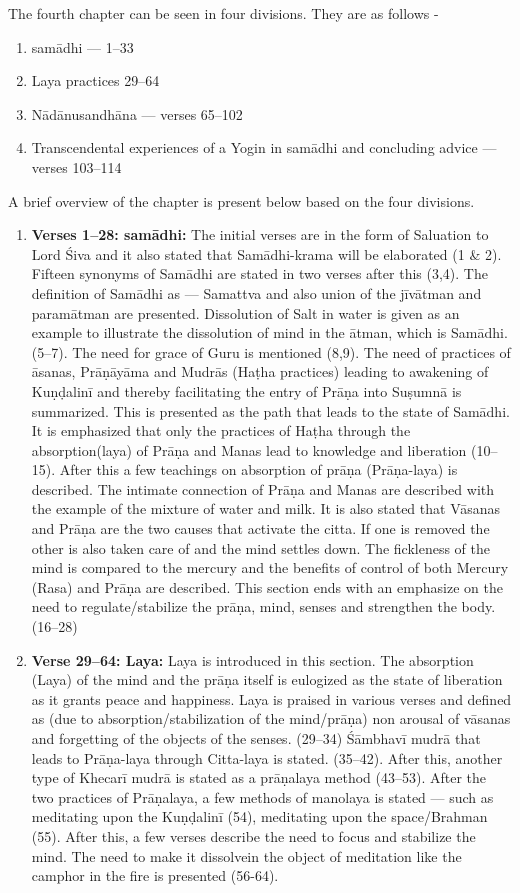 The fourth chapter can be seen in four divisions. They are as follows -

\begin{enumerate}
\item samādhi --- 1--33
\item Laya practices 29--64
\item Nādānusandhāna --- verses 65--102
\item Transcendental experiences of a Yogin in samādhi and concluding advice ---  verses 103--114
\end{enumerate}

A brief overview of the chapter is present below based on the four divisions.

\begin{enumerate}
\item \textbf{Verses 1--28:  samādhi:} The initial verses are in the form of Saluation to Lord Śiva and it also stated that Samādhi-krama will be elaborated (1 \& 2). Fifteen synonyms of Samādhi are stated in two verses after this (3,4). The definition of Samādhi as --- Samattva and also union of the jīvātman and paramātman are presented. Dissolution of Salt in water is given as an example to illustrate the dissolution of mind in the ātman, which is Samādhi.(5--7). The need for grace of Guru is mentioned (8,9). The need of practices of āsanas, Prāṇāyāma and Mudrās (Haṭha practices) leading to awakening of Kuṇḍalinī and thereby facilitating the entry of Prāṇa into Suṣumnā is summarized. This is presented as the path that leads to the state of Samādhi. It is emphasized that only the practices of Haṭha through the absorption(laya) of Prāṇa and Manas lead to  knowledge and liberation (10--15). After this a few teachings on absorption of prāṇa (Prāṇa-laya) is described. The intimate connection of Prāṇa and Manas are described with the example of the mixture of water and milk. It is also stated that Vāsanas and Prāṇa are the two causes that activate the citta. If one is removed the other is also taken care of and the mind settles down. The fickleness of the mind is compared to the mercury and the benefits of control of both Mercury (Rasa) and Prāṇa are described. This section ends with an emphasize on the need to regulate/stabilize the prāṇa, mind, senses and strengthen the body.(16--28)

\item \textbf{Verse 29--64: Laya:} Laya is introduced in this section.  The absorption (Laya) of the mind and the prāṇa itself is eulogized as the state of liberation as it grants peace and happiness. Laya is praised in various verses and defined as (due to absorption/stabilization of the mind/prāṇa) non arousal of vāsanas and forgetting of the objects of the senses. (29--34) Śāmbhavī mudrā that leads to Prāṇa-laya through Citta-laya is stated. (35--42). After this, another type of Khecarī mudrā is stated as a prāṇalaya method (43--53). After the two practices of Prāṇalaya, a few methods of manolaya is stated --- such as meditating upon the Kuṇḍalinī (54), meditating upon the space/Brahman (55). After this, a few verses describe the need to focus and stabilize the mind. The need to make it  dissolvein the object of meditation like the camphor in the fire is presented (56-64).


\end{enumerate}
